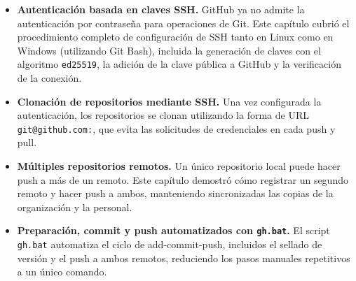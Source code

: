 \begin{itemize}
    \item \textbf{Autenticación basada en claves SSH.} GitHub ya no admite
    la autenticación por contraseña para operaciones de Git. Este capítulo cubrió el
    procedimiento completo de configuración de SSH tanto en Linux como en Windows (utilizando Git Bash),
    incluida la generación de claves con el algoritmo \texttt{ed25519}, la adición
    de la clave pública a GitHub y la verificación de la conexión.

    \item \textbf{Clonación de repositorios mediante SSH.} Una vez configurada
    la autenticación, los repositorios se clonan utilizando la forma de URL
    \texttt{git@github.com:}, que evita las solicitudes de credenciales en cada push y pull.

    \item \textbf{Múltiples repositorios remotos.} Un único repositorio local
    puede hacer push a más de un remoto. Este capítulo demostró cómo
    registrar un segundo remoto y hacer push a ambos, manteniendo sincronizadas las copias
    de la organización y la personal.

    \item \textbf{Preparación, commit y push automatizados con
    \texttt{gh.bat}.} El script \texttt{gh.bat} automatiza el ciclo de
    add-commit-push, incluidos el sellado de versión y el push a
    ambos remotos, reduciendo los pasos manuales repetitivos a un único comando.
\end{itemize}
